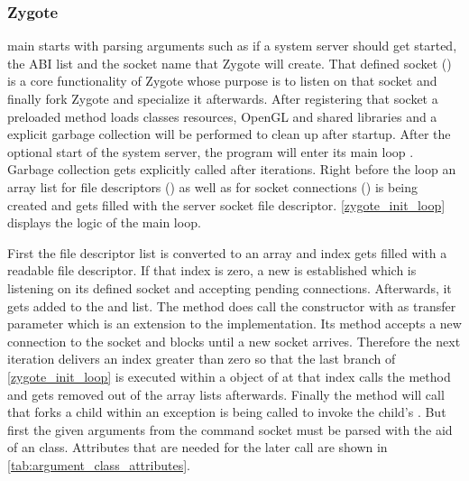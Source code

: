 \subsubsection{Zygote}\label{section:zygote}
 main starts with parsing arguments such as if a system
server should get started, the ABI list and the socket name that Zygote will
create. That defined socket () is a core functionality of Zygote whose purpose
is to listen on that socket and  finally fork Zygote and specialize it afterwards. After registering that socket a preloaded method loads classes
resources, OpenGL and shared libraries and a explicit garbage collection
 will be performed to clean up after startup. After the optional start of the system server, the program will enter its main loop
. Garbage collection gets explicitly called
after  iterations. Right before the loop an array list for file descriptors () as well as for socket connections () is being
created and  gets filled with the server socket file descriptor.
\autoref{zygote_init_loop} displays the logic of the main loop.



First the file descriptor list is converted to an array and index gets
filled with a readable file descriptor. If that index is zero,
a new  is established which is listening
on its defined socket and accepting pending connections.
Afterwards, it gets added to the 
and  list.
The  method does
call the  constructor with 
as transfer parameter which is an extension to the 
implementation. Its  method accepts a new connection
to the socket and blocks until a new socket arrives.
Therefore the next iteration delivers an index greater than zero so that
the last  branch of \autoref{zygote_init_loop} is executed within
a  object of  at that index calls
the  method and gets removed out of the array lists afterwards.
Finally the  method will call 
that forks a child within an exception is being called to invoke the child's
.
But first the given arguments from the command socket must be parsed with the
aid of an  class. Attributes that are needed for the later  call are shown in \autoref{tab:argument_class_attributes}.

